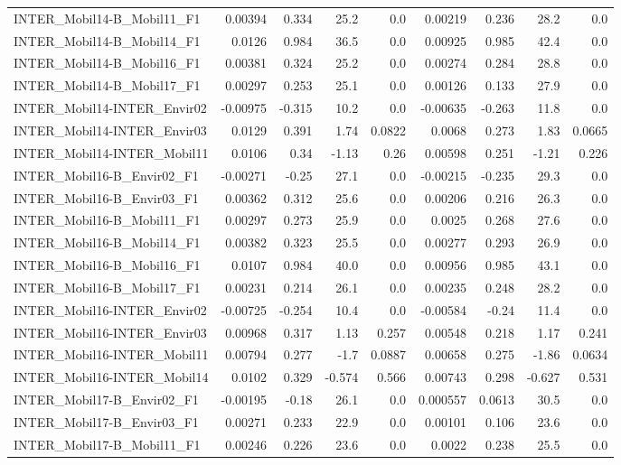 \begin{tabular}{lrrrrrrrr}
INTER_Mobil14-B_Mobil11_F1 & 0.00394 & 0.334 & 25.2 & 0.0 & 0.00219 & 0.236 & 28.2 & 0.0 \\
INTER_Mobil14-B_Mobil14_F1 & 0.0126 & 0.984 & 36.5 & 0.0 & 0.00925 & 0.985 & 42.4 & 0.0 \\
INTER_Mobil14-B_Mobil16_F1 & 0.00381 & 0.324 & 25.2 & 0.0 & 0.00274 & 0.284 & 28.8 & 0.0 \\
INTER_Mobil14-B_Mobil17_F1 & 0.00297 & 0.253 & 25.1 & 0.0 & 0.00126 & 0.133 & 27.9 & 0.0 \\
INTER_Mobil14-INTER_Envir02 & -0.00975 & -0.315 & 10.2 & 0.0 & -0.00635 & -0.263 & 11.8 & 0.0 \\
INTER_Mobil14-INTER_Envir03 & 0.0129 & 0.391 & 1.74 & 0.0822 & 0.0068 & 0.273 & 1.83 & 0.0665 \\
INTER_Mobil14-INTER_Mobil11 & 0.0106 & 0.34 & -1.13 & 0.26 & 0.00598 & 0.251 & -1.21 & 0.226 \\
INTER_Mobil16-B_Envir02_F1 & -0.00271 & -0.25 & 27.1 & 0.0 & -0.00215 & -0.235 & 29.3 & 0.0 \\
INTER_Mobil16-B_Envir03_F1 & 0.00362 & 0.312 & 25.6 & 0.0 & 0.00206 & 0.216 & 26.3 & 0.0 \\
INTER_Mobil16-B_Mobil11_F1 & 0.00297 & 0.273 & 25.9 & 0.0 & 0.0025 & 0.268 & 27.6 & 0.0 \\
INTER_Mobil16-B_Mobil14_F1 & 0.00382 & 0.323 & 25.5 & 0.0 & 0.00277 & 0.293 & 26.9 & 0.0 \\
INTER_Mobil16-B_Mobil16_F1 & 0.0107 & 0.984 & 40.0 & 0.0 & 0.00956 & 0.985 & 43.1 & 0.0 \\
INTER_Mobil16-B_Mobil17_F1 & 0.00231 & 0.214 & 26.1 & 0.0 & 0.00235 & 0.248 & 28.2 & 0.0 \\
INTER_Mobil16-INTER_Envir02 & -0.00725 & -0.254 & 10.4 & 0.0 & -0.00584 & -0.24 & 11.4 & 0.0 \\
INTER_Mobil16-INTER_Envir03 & 0.00968 & 0.317 & 1.13 & 0.257 & 0.00548 & 0.218 & 1.17 & 0.241 \\
INTER_Mobil16-INTER_Mobil11 & 0.00794 & 0.277 & -1.7 & 0.0887 & 0.00658 & 0.275 & -1.86 & 0.0634 \\
INTER_Mobil16-INTER_Mobil14 & 0.0102 & 0.329 & -0.574 & 0.566 & 0.00743 & 0.298 & -0.627 & 0.531 \\
INTER_Mobil17-B_Envir02_F1 & -0.00195 & -0.18 & 26.1 & 0.0 & 0.000557 & 0.0613 & 30.5 & 0.0 \\
INTER_Mobil17-B_Envir03_F1 & 0.00271 & 0.233 & 22.9 & 0.0 & 0.00101 & 0.106 & 23.6 & 0.0 \\
INTER_Mobil17-B_Mobil11_F1 & 0.00246 & 0.226 & 23.6 & 0.0 & 0.0022 & 0.238 & 25.5 & 0.0 \\

\end{tabular}
